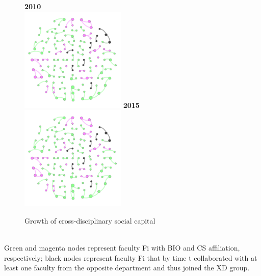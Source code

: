 \documentclass[10pt]{article}         %
\begin{document}
\begin{figure}[!htb]
  \endminipage\hfill
    \textbf{2010}\\
    \includegraphics[width=5cm, height=5cm]{S42010.png}
  \endminipage\hfill
    \textbf{2015}\\
    \includegraphics[width=5cm, height=5cm]{S42015.png}
  \endminipage
  \caption{Growth of cross-disciplinary social capital}
  \label{fig:s4}
\end{figure}\\
Green and magenta nodes represent faculty Fi with BIO and CS affiliation, respectively; black nodes represent faculty Fi that by time t collaborated with at least one faculty from the opposite department and thus joined the XD group.


\bigskip   %
\end{document}
